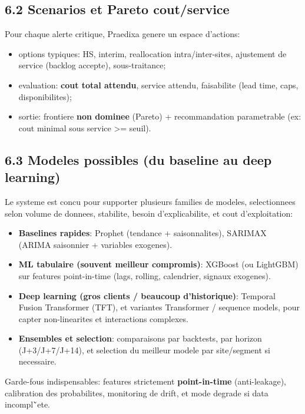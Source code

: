 \documentclass[11pt,a4paper]{article}
\begin{document}
\subsection*{6.2 Scenarios et Pareto cout/service}
Pour chaque alerte critique, Praedixa genere un espace d'actions:
\begin{itemize}
  \item options typiques: HS, interim, reallocation intra/inter-sites, ajustement de service (backlog accepte), sous-traitance;
  \item evaluation: \textbf{cout total attendu}, service attendu, faisabilite (lead time, caps, disponibilites);
  \item sortie: frontiere \textbf{non dominee} (Pareto) + recommandation parametrable (ex: cout minimal sous service >= seuil).
\end{itemize}

\subsection*{6.3 Modeles possibles (du baseline au deep learning)}
Le systeme est concu pour supporter plusieurs families de modeles, selectionnees selon volume de donnees, stabilite, besoin d'explicabilite, et cout d'exploitation:
\begin{itemize}
  \item \textbf{Baselines rapides}: Prophet (tendance + saisonnalites), SARIMAX (ARIMA saisonnier + variables exogenes).
  \item \textbf{ML tabulaire (souvent meilleur compromis)}: XGBoost (ou LightGBM) sur features point-in-time (lags, rolling, calendrier, signaux exogenes).
  \item \textbf{Deep learning (gros clients / beaucoup d'historique)}: Temporal Fusion Transformer (TFT), et variantes Transformer / sequence models, pour capter non-linearites et interactions complexes.
  \item \textbf{Ensembles et selection}: comparaisons par backtests, par horizon (J+3/J+7/J+14), et selection du meilleur modele par site/segment si necessaire.
\end{itemize}
Garde-fous indispensables: features strictement \textbf{point-in-time} (anti-leakage), calibration des probabilites, monitoring de drift, et mode degrade si data incompl\u`ete.
\end{document}
